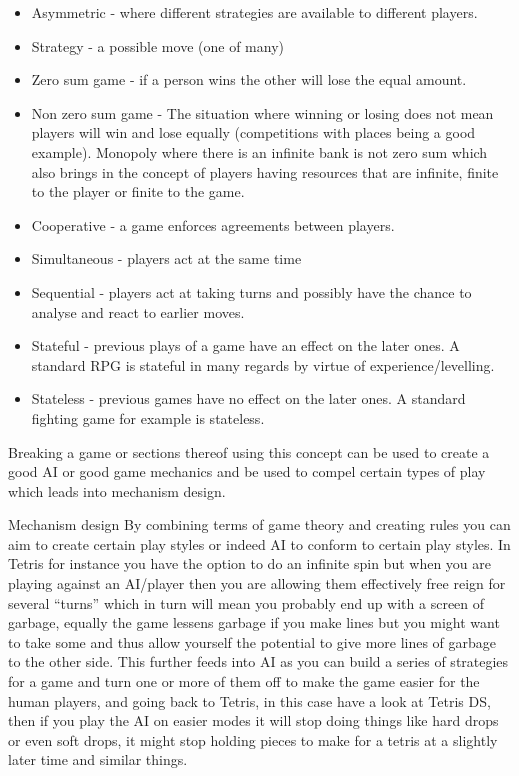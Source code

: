 \documentclass[
]{book}
\begin{document}
\begin{itemize}
\item
  Asymmetric - where different strategies are available to different players.
\item
  Strategy - a possible move (one of many)
\item
  Zero sum game - if a person wins the other will lose the equal amount.
\item
  Non zero sum game - The situation where winning or losing does not mean players will win and lose equally (competitions with places being a good example). Monopoly where there is an infinite bank is not zero sum which also brings in the concept of players having resources that are infinite, finite to the player or finite to the game.
\item
  Cooperative - a game enforces agreements between players.
\item
  Simultaneous - players act at the same time
\item
  Sequential - players act at taking turns and possibly have the chance to analyse and react to earlier moves.
\item
  Stateful - previous plays of a game have an effect on the later ones. A standard RPG is stateful in many regards by virtue of experience/levelling.
\item
  Stateless - previous games have no effect on the later ones. A standard fighting game for example is stateless.
\end{itemize}

Breaking a game or sections thereof using this concept can be used to create a good AI or good game mechanics and be used to compel certain types of play which leads into mechanism design.

Mechanism design By combining terms of game theory and creating rules you can aim to create certain play styles or indeed AI to conform to certain play styles. In Tetris for instance you have the option to do an infinite spin but when you are playing against an AI/player then you are allowing them effectively free reign for several ``turns'' which in turn will mean you probably end up with a screen of garbage, equally the game lessens garbage if you make lines but you might want to take some and thus allow yourself the potential to give more lines of garbage to the other side. This further feeds into AI as you can build a series of strategies for a game and turn one or more of them off to make the game easier for the human players, and going back to Tetris, in this case have a look at Tetris DS, then if you play the AI on easier modes it will stop doing things like hard drops or even soft drops, it might stop holding pieces to make for a tetris at a slightly later time and similar things.
\end{document}
